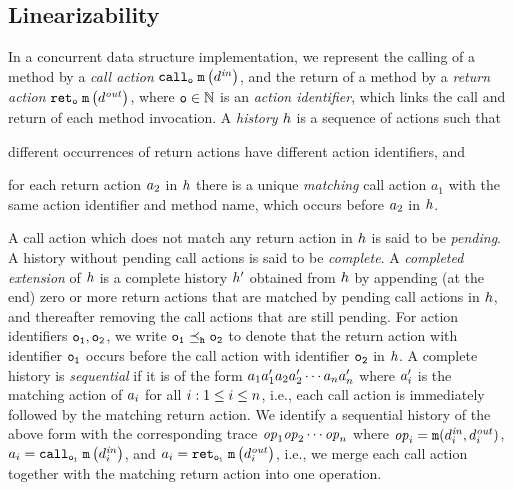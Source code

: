 \subsection{Linearizability}
In a concurrent
data structure implementation, we represent the calling of a method by
a {\it call action} $\mathtt{call}_{\tt o}\; {\tt m}\left(d^{\it in}\right)$, and the return of a method by
a {\it return action} $\mathtt{ret}_{\tt o}\; {\tt m}\left(d^{\it out}\right)$, where $\tt o\in\mathbb{N}$ is an
{\it action identifier}, which links the call and return of each method invocation.
%
A {\it history} $h$ is a sequence of actions such that
\begin{inparaenum}[(i)]
\item
  different occurrences of return actions have different action identifiers, and
\item
  for each return action $a_2$ in $h$ there is a unique
{\it matching}  call action $a_1$ with the same action identifier and method name, which occurs before $a_2$ in $h$.
\end{inparaenum}
%
A call action which does not match any return action in $h$ is said
to be {\em pending}.
A history without pending call actions is said to be {\em complete}.
A {\em completed extension} of $h$ is a complete history
$h'$ obtained from $h$ by
  appending (at the end) zero or more return actions that are matched by
  pending call actions in $h$, and
  thereafter removing the call actions that are still pending.
%
For action identifiers $\tt o_1,\tt o_2$, we write
$\tt o_1\preceq_{h}\tt o_2$ to denote that
the return action with identifier $\tt o_1$ occurs before
the call action with identifier $\tt o_2$ in $h$.
A complete history is {\it sequential} if it is of the form
$a_1a'_1a_2a'_2\cdots a_na'_n$
where $a'_i$ is the matching action of $a_i$ 
for all $i:1\leq i\leq n$, i.e., each call action 
is immediately followed by the matching return action. 
%
We identify a sequential history of the above form with
the corresponding trace 
${\it op}_1{\it op}_2\cdots{\it op}_n$ where
${\it op}_i={\tt m}(d^{\it in}_i,d^{\it out}_i)$,
$a_i=\mathtt{call}_{\tt o_i}\; {\tt m}\left(d^{\it in}_{i}\right)$, and
$a_i=\mathtt{ret}_{\tt o_i}\; {\tt m}\left(d^{\it out}_{i}\right)$,
i.e., we merge each call action together with the matching return action
into one operation.
